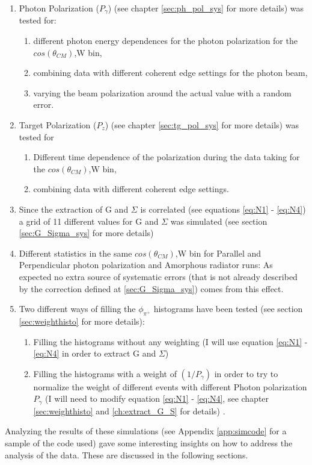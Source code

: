 \begin{enumerate}
\item Photon Polarization ($P_{\gamma}$) (see chapter \ref{sec:ph_pol_sys} for more details) was tested for:
  \begin{enumerate}
  \item different photon energy dependences for the photon polarization for the $cos(\theta_{CM})$,W bin,
  \item combining data with different coherent edge settings for the photon beam,
  \item varying the beam polarization around the actual value with a random error.
  \end{enumerate}
\item Target Polarization ($P_z$) (see chapter \ref{sec:tg_pol_sys} for more details) was tested for
  \begin{enumerate}
  \item Different time dependence of the polarization during the data taking for the $cos(\theta_{CM})$,W bin,
  \item combining data with different coherent edge settings.
  \end{enumerate}
\item Since the extraction of G and $\Sigma$ is correlated (see  equations \ref{eq:N1} - \ref{eq:N4}) a grid of 11 different values for G and $\Sigma$ was simulated (see section \ref{sec:G_Sigma_sys} for more details)
\item Different statistics in the same $cos(\theta_{CM})$,W bin for Parallel and Perpendicular photon polarization and Amorphous radiator runs: As expected no extra source of systematic errors (that is not already described by the correction defined at \ref{sec:G_Sigma_sys}) comes from this effect. 
\item Two different ways of filling the $\phi_{\pi^+}$ histograms have been tested (see section \ref{sec:weighthisto} for more details):
  \begin{enumerate}
  \item Filling the histograms without any weighting (I will use equation \ref{eq:N1} - \ref{eq:N4} in order to extract G and $\Sigma$)
  \item Filling the histograms with a weight of $(1/P_{\gamma})$ in order to try to normalize the weight of different events with different Photon polarization  $P_{\gamma}$ (I will need to modify equation \ref{eq:N1} - \ref{eq:N4}, see chapter \ref{sec:weighthisto} and \ref{ch:extract_G_S} for details) .
  \end{enumerate}
\end{enumerate}
Analyzing the results of these simulations (see Appendix \ref{app:simcode} for a sample of the code used) gave some interesting insights on how to address the analysis of the data. These are discussed in the following sections.


